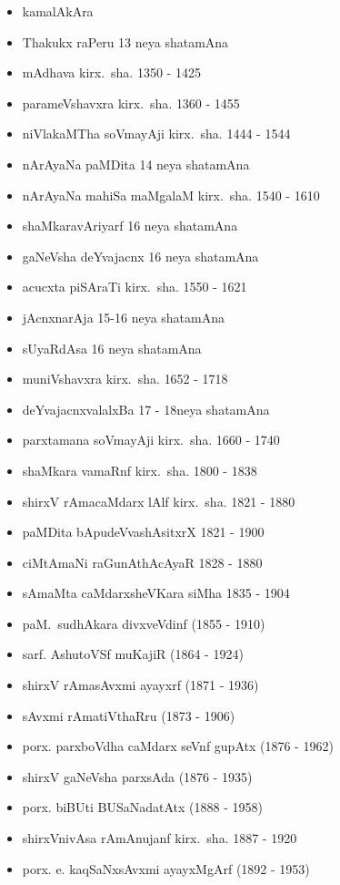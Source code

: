 {\begin{itemize}
\item kamalAkAra
\item Thakukx raPeru {\rm 13} neya shatamAna
\item mAdhava kirx.~sha. {\rm 1350 - 1425}
\item parameVshavxra kirx.~sha. {\rm 1360 - 1455}
\item niVlakaMTha soVmayAji kirx.~sha. {\rm 1444 - 1544}
\item nArAyaNa paMDita {\rm 14} neya shatamAna
\item nArAyaNa mahiSa maMgalaM kirx.~sha. {\rm 1540 - 1610}
\item shaMkaravAriyarf {\rm 16} neya shatamAna
\item gaNeVsha deYvajacnx {\rm 16} neya shatamAna
\item acucxta piSAraTi kirx.~sha. {\rm 1550 - 1621}
\item jAcnxnarAja {\rm 15-16} neya shatamAna
\item sUyaRdAsa {\rm 16} neya shatamAna
\item muniVshavxra kirx.~sha. {\rm 1652 - 1718}
\item deYvajacnxvalalxBa {\rm 17 - 18}neya shatamAna
\item parxtamana soVmayAji kirx.~sha. {\rm 1660 - 1740}
\item shaMkara vamaRnf kirx.~sha. {\rm 1800 - 1838}
\item shirxV rAmacaMdarx lAlf kirx.~sha. {\rm 1821 - 1880}
\item paMDita bApudeVvashAsitxrX {\rm 1821 - 1900}
\item ciMtAmaNi raGunAthAcAyaR {\rm 1828 - 1880}
\item sAmaMta caMdarxsheVKara siMha {\rm 1835 - 1904}
\item paM.~sudhAkara divxveVdinf {\rm (1855 - 1910)}
\item sarf. AshutoVSf muKajiR {\rm (1864 - 1924)}
\item shirxV rAmasAvxmi ayayxrf {\rm (1871 - 1936)}
\item sAvxmi rAmatiVthaRru {\rm (1873 - 1906)}
\item porx. parxboVdha caMdarx seVnf gupAtx {\rm (1876 - 1962)}
\item shirxV gaNeVsha parxsAda {\rm (1876 - 1935)}
\item porx. biBUti BUSaNadatAtx {\rm (1888 - 1958)}
\item shirxVnivAsa rAmAnujanf kirx.~sha. {\rm 1887 - 1920}
\item porx. e. kaqSaNxsAvxmi ayayxMgArf {\rm (1892 - 1953)}

\end{itemize}}
